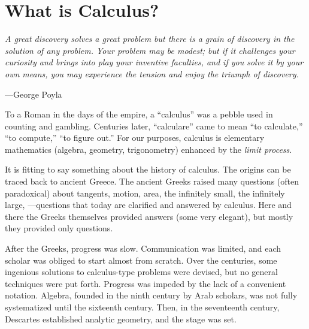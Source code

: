 \documentclass[titlepage,a4paper,12pt]{report}
\begin{document}
\chapter{What is Calculus?}
\begin{center}
	\small{\parbox{18cm}{
		\begin{raggedright}
		{\small
		\textit{A great discovery solves a great problem but there is a grain of discovery in the
solution of any problem. Your problem may be modest; but if it challenges your
curiosity and brings into play your inventive faculties, and if you solve it by your
own means, you may experience the tension and enjoy the triumph of discovery.}
 }
 
				\vspace{.5cm}\hfill{---George Poyla}
		\end{raggedright}
	}
} 
\end{center}
To a Roman in the days of the empire, a ``calculus'' was a pebble used in counting and
gambling. Centuries later, ``calculare'' came to mean ``to calculate,'' ``to compute,'' ``to
figure out.'' For our purposes, calculus is elementary mathematics (algebra, geometry,
trigonometry) enhanced by the \textit{limit process}.

\noindent It is fitting to say something about the history of calculus. The origins can be traced
back to ancient Greece. The ancient Greeks raised many questions (often paradoxical)
about tangents, motion, area, the infinitely small, the infinitely large, ---questions that
today are clarified and answered by calculus. Here and there the Greeks themselves
provided answers (some very elegant), but mostly they provided only questions.

\noindent After the Greeks, progress was slow. Communication was limited, and each scholar
was obliged to start almost from scratch. Over the centuries, some ingenious solutions
to calculus-type problems were devised, but no general techniques were put forth.
Progress was impeded by the lack of a convenient notation. Algebra, founded in the
ninth century by Arab scholars, was not fully systematized until the sixteenth century.
Then, in the seventeenth century, Descartes established analytic geometry, and the stage
was set.
\end{document}

